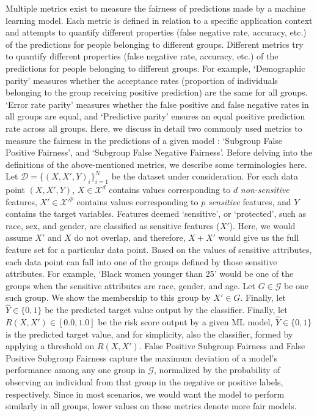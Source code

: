 \documentclass[
]{book}
\begin{document}
Multiple metrics exist to measure the fairness of predictions made by a machine learning model. Each metric is defined in relation to a specific application context and attempts to quantify different properties (false negative rate, accuracy, etc.) of the predictions for people belonging to different groups. Different metrics try to quantify different properties (false negative rate, accuracy, etc.) of the predictions for people belonging to different groups. For example, `Demographic parity' measures whether the acceptance rates (proportion of individuals belonging to the group receiving positive prediction) are the same for all groups. `Error rate parity' measures whether the false positive and false negative rates in all groups are equal, and `Predictive parity' ensures an equal positive prediction rate across all groups. Here, we discuss in detail two commonly used metrics to measure the fairness in the predictions of a given model : `Subgroup False Positive Fairness', and `Subgroup False Negative Fairness'.
Before delving into the definitions of the above-mentioned metrics, we describe some terminologies here. Let \(\mathcal{D} = \{{(X,X',Y)}_{i}\}_{i=1}^N\) be the dataset under consideration. For each data point \((X,X',Y)\), \(X \in \mathcal{X}^{d}\) contains values corresponding to \(d\) \emph{non-sensitive} features, \(X' \in \mathcal{X'}^{p}\) contains values corresponding to \(p\) \emph{sensitive} features, and \(Y\) contains the target variables. Features deemed `sensitive', or `protected', such as race, sex, and gender, are classified as sensitive features (\(X'\)). Here, we would assume \(X'\) and \(X\) do not overlap, and therefore, \(X+X'\) would give us the full feature set for a particular data point. Based on the values of sensitive attributes, each data point can fall into one of the groups defined by those sensitive attributes. For example, `Black women younger than 25' would be one of the groups when the sensitive attributes are race, gender, and age. Let \(G\in \mathcal{G}\) be one such group. We show the membership to this group by \(X'\in G\). Finally, let \(\hat{Y}\in \{0,1\}\) be the predicted target value output by the classifier. Finally, let \(R(X, X') \in [0.0,1.0]\) be the risk score output by a given ML model, \(\hat{Y}\in \{0,1\}\) is the predicted target value, and for simplicity, also the classifier, formed by applying a threshold on \(R(X,X')\).
False Positive Subgroup Fairness and False Positive Subgroup Fairness capture the maximum deviation of a model's performance among any one group in \(\mathcal{G}\), normalized by the probability of observing an individual from that group in the negative or positive labels, respectively. Since in most scenarios, we would want the model to perform similarly in all groups, lower values on these metrics denote more fair models.
\end{document}
